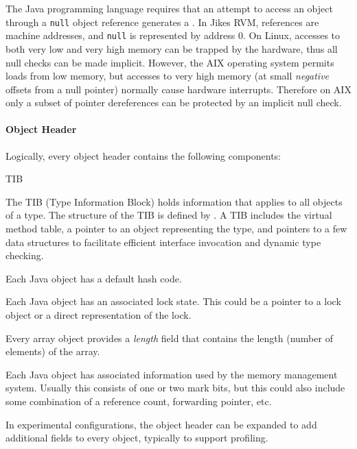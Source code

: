 The Java programming language requires that an attempt to access an
object through a {\tt null} object reference generates a
.  In Jikes RVM, references are
machine addresses, and {\tt null} is represented by address $0$.  
On Linux, accesses to both very low and very high memory can be
trapped by the hardware, thus all null checks can be made implicit.
However, the AIX\TMweb{} operating system permits loads from low
memory, but accesses to very high memory (at small {\em negative}
offsets from a null pointer) normally cause hardware 
interrupts. Therefore on AIX only a subset of pointer dereferences can
be protected by an implicit null check. 

\paragraph{Object Header}
Logically, every object header contains the following components:
\begin{description}
%
\begin{Label}{TIB}
\item[TIB Pointer] The TIB (Type Information Block) holds information that
applies to all objects of a type.  The structure of the TIB is defined by 
.
A TIB includes the virtual method table, a pointer to an object
representing the type, and pointers to a few data structures to
facilitate efficient interface invocation and dynamic type checking.
\end{Label}
%
\item[Default Hash Code] Each Java object has a default hash code.
%
\item[Lock] Each Java object has an associated lock state.  This could be a
pointer to a lock object or a direct representation of the lock.
%
\item[Array Length] Every array object provides a {\em length} field
that contains the length (number of elements) of the array.
%
\item[Garbage Collection Information] Each Java object has associated
information used by the memory management system.  Usually this consists of one
or two mark bits, but this could also include some combination of a reference
count, forwarding pointer, etc.
%
\item[Misc Fields] In experimental configurations, the object header
can be expanded to add additional fields to every object, typically to
support profiling. 
\end{description}

